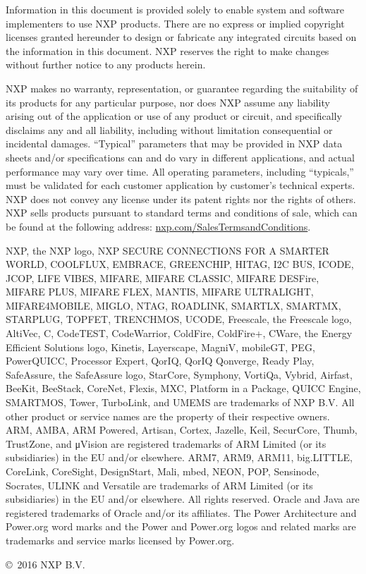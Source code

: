 \begin{flushleft} 
\textsf{Information in this document is provided solely to enable system and software implementers to use NXP products. There are no express or implied copyright licenses granted hereunder to design or fabricate any integrated circuits based on the information in this document. NXP reserves the right to make changes without further notice to any products herein.}\newline

\textsf{NXP makes no warranty, representation, or guarantee regarding the suitability of its products for any particular purpose, nor does NXP assume any liability arising out of the application or use of any product or circuit, and specifically disclaims any and all liability, including without limitation consequential or incidental damages. “Typical” parameters that may be provided in NXP data sheets and/or specifications can and do vary in different applications, and actual performance may vary over time. All operating parameters, including “typicals,” must be validated for each customer application by customer's technical experts. NXP does not convey any license under its patent rights nor the rights of others. NXP sells products pursuant to standard terms and conditions of sale, which can be found at the following address: \hyperlink{http://www.nxp.com/SalesTermsandConditions}{nxp.\-com/SalesTermsandConditions}.} \newline

\textsf{NXP, the NXP logo, NXP SECURE CONNECTIONS FOR A SMARTER WORLD, COOLFLUX, EMBRACE, GREENCHIP, HITAG, I2C BUS, ICODE, JCOP, LIFE VIBES, MIFARE, MIFARE CLASSIC, MIFARE DESFire, MIFARE PLUS, MIFARE FLEX, MANTIS, MIFARE ULTRALIGHT, MIFARE4MOBILE, MIGLO, NTAG, ROADLINK, SMARTLX, SMARTMX, STARPLUG, TOPFET, TRENCHMOS, UCODE, Freescale, the Freescale logo, AltiVec, C, CodeTEST, CodeWarrior, ColdFire, ColdFire+, C\textendash Ware, the Energy Efficient Solutions logo, Kinetis, Layerscape, MagniV, mobileGT, PEG, PowerQUICC, Processor Expert, QorIQ, QorIQ Qonverge, Ready Play, SafeAssure, the SafeAssure logo, StarCore, Symphony, VortiQa, Vybrid, Airfast, BeeKit, BeeStack, CoreNet, Flexis, MXC, Platform in a Package, QUICC Engine, SMARTMOS, Tower, TurboLink, and UMEMS are trademarks of NXP B.V. All other product or service names are the property of their respective owners.  ARM, AMBA, ARM Powered, Artisan, Cortex, Jazelle, Keil, SecurCore, Thumb, TrustZone, and μVision are registered trademarks of ARM Limited (or its subsidiaries) in the EU and/or elsewhere. ARM7, ARM9, ARM11, big.LITTLE, CoreLink, CoreSight, DesignStart, Mali, mbed, NEON, POP, Sensinode, Socrates, ULINK and Versatile are trademarks of ARM Limited (or its subsidiaries) in the EU and/or elsewhere. All rights reserved. Oracle and Java are registered trademarks of Oracle and/or its affiliates. The Power Architecture and Power.org word marks and the Power and Power.org logos and related marks are trademarks and service marks licensed by Power.org.} \newline

\textsf{
\copyright~2016 NXP B.V.} 
\end{flushleft}